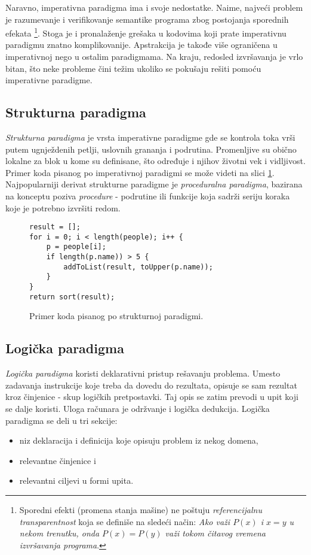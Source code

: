 Naravno, imperativna paradigma ima i svoje nedostatke. Naime, najveći problem je razumevanje i verifikovanje semantike programa zbog postojanja sporednih efekata \footnote{Sporedni efekti (promena stanja mašine) ne poštuju \emph{referencijalnu transparentnost} koja se definiše na sledeći način: \emph{Ako važi $P(x)$ i $x = y$ u nekom trenutku, onda $P(x) = P(y)$ važi tokom čitavog vremena izvršavanja programa}.}. Stoga je i pronalaženje grešaka u kodovima koji prate imperativnu paradigmu znatno komplikovanije. Apstrakcija je takođe više ograničena u imperativnoj nego u ostalim paradigmama. Na kraju, redosled izvršavanja je vrlo bitan, što neke probleme čini težim ukoliko se pokušaju rešiti pomoću imperativne paradigme.

\subsection{Strukturna paradigma}
\label{subsec:ParadigmImperativeStructural}

\emph{Strukturna paradigma} je vrsta imperativne paradigme gde se kontrola toka vrši putem ugnježdenih petlji, uslovnih grananja i podrutina. Promenljive su obično lokalne za blok u kome su definisane, što određuje i njihov životni vek i vidljivost. Primer koda pisanog po imperativnoj paradigmi se može videti na slici \ref{fig:ParadigmStructural}. Najpopularniji derivat strukturne paradigme je \emph{proceduralna paradigma}, bazirana na konceptu poziva \emph{procedure} - podrutine ili funkcije koja sadrži seriju koraka koje je potrebno izvršiti redom.

\begin{figure}[h!]
\begin{lstlisting}
result = [];
for i = 0; i < length(people); i++ {
    p = people[i];
    if length(p.name)) > 5 {
        addToList(result, toUpper(p.name));
    }
}
return sort(result);
\end{lstlisting}
\caption{Primer koda pisanog po strukturnoj paradigmi.}
\label{fig:ParadigmStructural}
\end{figure}


\subsection{Logička paradigma}
\label{subsec:ParadigmLogical}

\emph{Logička paradigma} koristi deklarativni pristup rešavanju problema. Umesto zadavanja instrukcije koje treba da dovedu do rezultata, opisuje se sam rezultat kroz činjenice - skup logičkih pretpostavki. Taj opis se zatim prevodi u upit koji se dalje koristi. Uloga računara je održvanje i logička dedukcija. Logička paradigma se deli u tri sekcije:
\begin{itemize}
    \item niz deklaracija i definicija koje opisuju problem iz nekog domena,
    \item relevantne činjenice i
    \item relevantni ciljevi u formi upita.
\end{itemize}

